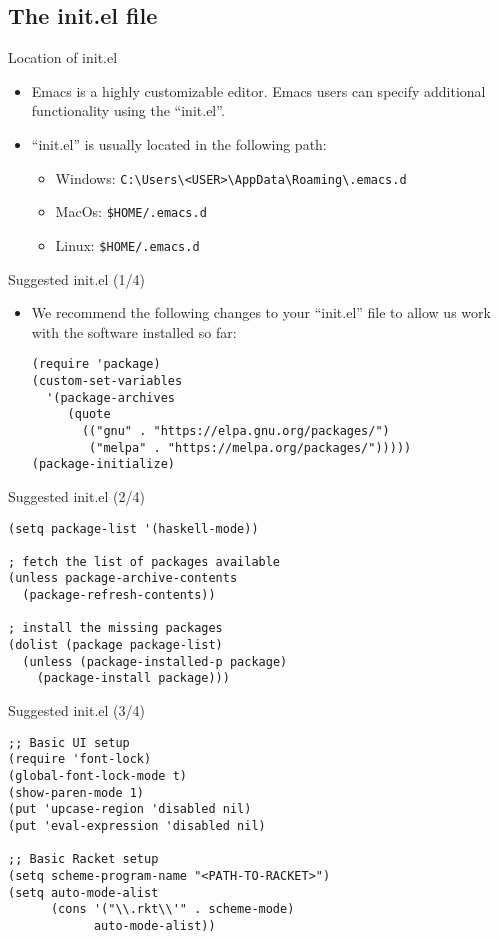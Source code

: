 \subsection{The init.el file}

\begin{frame}[fragile]{Location of init.el}
  \begin{itemize}
  \item Emacs is a highly customizable editor. Emacs users can specify
    additional functionality using the ``init.el''.
  \item ``init.el'' is usually located in the following path:
    \begin{itemize}
    \item Windows: \verb|C:\Users\<USER>\AppData\Roaming\.emacs.d|
    \item MacOs: \verb|$HOME/.emacs.d|
    \item Linux: \verb|$HOME/.emacs.d|
    \end{itemize}
  \end{itemize} 
\end{frame}

\begin{frame}[fragile]{Suggested init.el (1/4)}
  \begin{itemize}
  \item We recommend the following changes to your ``init.el'' file to allow us
    work with the software installed so far:
\begin{verbatim}
(require 'package)
(custom-set-variables
  '(package-archives
     (quote
       (("gnu" . "https://elpa.gnu.org/packages/")
        ("melpa" . "https://melpa.org/packages/")))))
(package-initialize)
\end{verbatim}
  \end{itemize} 
\end{frame}

\begin{frame}[fragile]{Suggested init.el (2/4)}
\begin{verbatim}
(setq package-list '(haskell-mode))

; fetch the list of packages available 
(unless package-archive-contents
  (package-refresh-contents))

; install the missing packages
(dolist (package package-list)
  (unless (package-installed-p package)
    (package-install package)))
\end{verbatim}
\end{frame}

\begin{frame}[fragile]{Suggested init.el (3/4)}
 \begin{verbatim}
;; Basic UI setup
(require 'font-lock)
(global-font-lock-mode t)
(show-paren-mode 1)
(put 'upcase-region 'disabled nil)
(put 'eval-expression 'disabled nil)

;; Basic Racket setup
(setq scheme-program-name "<PATH-TO-RACKET>")
(setq auto-mode-alist
      (cons '("\\.rkt\\'" . scheme-mode)
            auto-mode-alist))
\end{verbatim} 
\end{frame}


